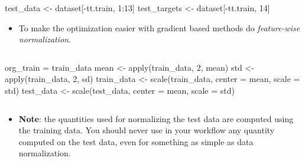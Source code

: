 \documentclass[
  10pt,
  ignorenonframetext,
]{beamer}
\newenvironment{Shaded}{\begin{snugshade}}{\end{snugshade}}
\newcommand{\AttributeTok}[1]{\textcolor[rgb]{0.77,0.63,0.00}{#1}}
\newcommand{\DecValTok}[1]{\textcolor[rgb]{0.00,0.00,0.81}{#1}}
\newcommand{\FunctionTok}[1]{\textcolor[rgb]{0.00,0.00,0.00}{#1}}
\newcommand{\NormalTok}[1]{#1}
\newcommand{\OtherTok}[1]{\textcolor[rgb]{0.56,0.35,0.01}{#1}}
\newcommand{\SpecialCharTok}[1]{\textcolor[rgb]{0.00,0.00,0.00}{#1}}
\providecommand{\tightlist}{%
  \setlength{\itemsep}{0pt}\setlength{\parskip}{0pt}}
\begin{document}
\begin{frame}[fragile]
\begin{Shaded}
\begin{Highlighting}[]
\NormalTok{test\_data }\OtherTok{\textless{}{-}}\NormalTok{ dataset[}\SpecialCharTok{{-}}\NormalTok{tt.train, }\DecValTok{1}\SpecialCharTok{:}\DecValTok{13}\NormalTok{]}
\NormalTok{test\_targets }\OtherTok{\textless{}{-}}\NormalTok{ dataset[}\SpecialCharTok{{-}}\NormalTok{tt.train, }\DecValTok{14}\NormalTok{]}
\end{Highlighting}
\end{Shaded}
\end{frame}

\begin{frame}[fragile]
\begin{itemize}
\tightlist
\item
  To make the optimization easier with gradient based methods do
  \emph{feature-wise normalization}.
\end{itemize}

\(~\)

\scriptsize

\begin{Shaded}
\begin{Highlighting}[]
\NormalTok{org\_train }\OtherTok{=}\NormalTok{ train\_data}
\NormalTok{mean }\OtherTok{\textless{}{-}} \FunctionTok{apply}\NormalTok{(train\_data, }\DecValTok{2}\NormalTok{, mean)}
\NormalTok{std }\OtherTok{\textless{}{-}} \FunctionTok{apply}\NormalTok{(train\_data, }\DecValTok{2}\NormalTok{, sd)}
\NormalTok{train\_data }\OtherTok{\textless{}{-}} \FunctionTok{scale}\NormalTok{(train\_data, }\AttributeTok{center =}\NormalTok{ mean, }\AttributeTok{scale =}\NormalTok{ std)}
\NormalTok{test\_data }\OtherTok{\textless{}{-}} \FunctionTok{scale}\NormalTok{(test\_data, }\AttributeTok{center =}\NormalTok{ mean, }\AttributeTok{scale =}\NormalTok{ std)}
\end{Highlighting}
\end{Shaded}

\(~\)

\normalsize

\begin{itemize}
\tightlist
\item
  \textbf{Note}: the quantities used for normalizing the test data are
  computed using the training data. You should never use in your
  workflow any quantity computed on the test data, even for something as
  simple as data normalization.
\end{itemize}
\end{frame}
\end{document}
